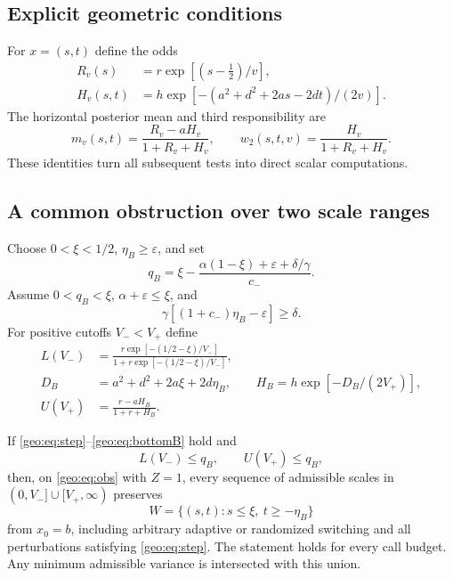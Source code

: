 \subsection{Explicit geometric conditions}
For $x=(s,t)$ define the odds
\begin{align}
 R_v(s)&=r\exp[(s-\tfrac12)/v],\label{geo:eq:oddsR}\\
 H_v(s,t)&=h\exp[-(a^2+d^2+2as-2dt)/(2v)].\label{geo:eq:oddsH}
\end{align}
The horizontal posterior mean and third responsibility are
\begin{equation}\label{geo:eq:mean}
 m_v(s,t)=\frac{R_v-aH_v}{1+R_v+H_v},\qquad
 w_2(s,t,v)=\frac{H_v}{1+R_v+H_v}.
\end{equation}
These identities turn all subsequent tests into direct scalar computations.

\subsection{A common obstruction over two scale ranges}
Choose $0<\xi<1/2$, $\eta_B\ge\varepsilon$, and set
\begin{equation}\label{geo:eq:qB}
 q_B=\xi-\frac{\alpha(1-\xi)+\varepsilon+\delta/\gamma}{c_-}.
\end{equation}
Assume $0<q_B<\xi$, $\alpha+\varepsilon\le\xi$, and
\begin{equation}\label{geo:eq:bottomB}
 \gamma[(1+c_-)\eta_B-\varepsilon]\ge\delta.
\end{equation}
For positive cutoffs $V_-<V_+$ define
\begin{align}
 L(V_-)&=\frac{r\exp[-(1/2-\xi)/V_-]}
 {1+r\exp[-(1/2-\xi)/V_-]},\label{geo:eq:low}\\
 D_B&=a^2+d^2+2a\xi+2d\eta_B,\qquad
 H_B=h\exp[-D_B/(2V_+)],\label{geo:eq:highodds}\\
 U(V_+)&=\frac{r-aH_B}{1+r+H_B}.\label{geo:eq:high}
\end{align}

\begin{proposition}\label{geo:prop:barrier}
If \eqref{geo:eq:step}--\eqref{geo:eq:bottomB} hold and
\begin{equation}\label{geo:eq:barriertest}
 L(V_-)\le q_B,\qquad U(V_+)\le q_B,
\end{equation}
then, on \eqref{geo:eq:obs} with $Z=1$, every sequence of admissible scales in
$(0,V_-]\cup[V_+,\infty)$ preserves
\[
 W=\{(s,t):s\le\xi,\ t\ge-\eta_B\}
\]
from $x_0=b$, including arbitrary adaptive or randomized switching and all
perturbations satisfying \eqref{geo:eq:step}. The statement holds for every call
budget. Any minimum admissible variance is intersected with this union.
\end{proposition}

